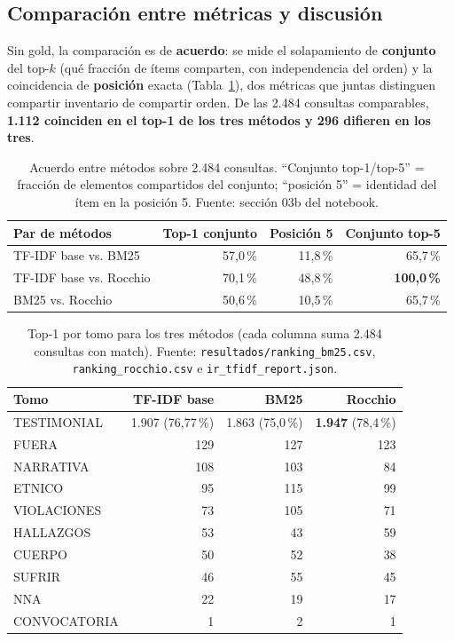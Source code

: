 \documentclass[11pt]{tg_usta}
\begin{document}
\subsection{Comparación entre métricas y discusión}

Sin gold, la comparación es de \textbf{acuerdo}: se mide el solapamiento de \textbf{conjunto} del top-$k$ (qué fracción de ítems comparten, con independencia del orden) y la coincidencia de \textbf{posición} exacta (Tabla~\ref{tab:acuerdo}), dos métricas que juntas distinguen compartir inventario de compartir orden. De las 2.484 consultas comparables, \textbf{1.112 coinciden en el top-1 de los tres métodos y 296 difieren en los tres}.

\begin{table}[htbp]
    \centering
    \caption{Acuerdo entre métodos sobre 2.484 consultas. ``Conjunto top-1/top-5'' = fracción de elementos compartidos del conjunto; ``posición 5'' = identidad del ítem en la posición 5. Fuente: sección 03b del notebook.}
    \small
    \setlength{\tabcolsep}{6pt}
    \begin{tabular}{l r r r}
    \toprule
    Par de métodos & Top-1 conjunto & Posición 5 & Conjunto top-5 \\
    \midrule
    TF-IDF base vs. BM25 & 57,0\,\% & 11,8\,\% & 65,7\,\% \\
    TF-IDF base vs. Rocchio & 70,1\,\% & 48,8\,\% & \textbf{100,0\,\%} \\
    BM25 vs. Rocchio & 50,6\,\% & 10,5\,\% & 65,7\,\% \\
    \bottomrule
    \end{tabular}
    \label{tab:acuerdo}
\end{table}

\begin{table}[htbp]
    \centering
    \caption{Top-1 por tomo para los tres métodos (cada columna suma 2.484 consultas con match). Fuente: \texttt{resultados/ranking\_bm25.csv}, \texttt{ranking\_rocchio.csv} e \texttt{ir\_tfidf\_report.json}.}
    \small
    \setlength{\tabcolsep}{6pt}
    \begin{tabular}{l r r r}
    \toprule
    Tomo & TF-IDF base & BM25 & Rocchio \\
    \midrule
    TESTIMONIAL & 1.907 (76,77\,\%) & 1.863 (75,0\,\%) & \textbf{1.947} (78,4\,\%) \\
    FUERA & 129 & 127 & 123 \\
    NARRATIVA & 108 & 103 & 84 \\
    ETNICO & 95 & 115 & 99 \\
    VIOLACIONES & 73 & 105 & 71 \\
    HALLAZGOS & 53 & 43 & 59 \\
    CUERPO & 50 & 52 & 38 \\
    SUFRIR & 46 & 55 & 45 \\
    NNA & 22 & 19 & 17 \\
    CONVOCATORIA & 1 & 2 & 1 \\
    \bottomrule
    \end{tabular}
    \label{tab:top1-tomo}
\end{table}
\end{document}
